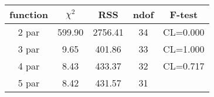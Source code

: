 \begin{tabular}{c|c|c|c|c}
function & $\chi^2$ & RSS & ndof & F-test \\
\hline
2 par & 599.90 & 2756.41 & 34 & CL=0.000 \\
3 par & 9.65 & 401.86 & 33 & CL=1.000 \\
4 par & 8.43 & 433.37 & 32 & CL=0.717 \\
5 par & 8.42 & 431.57 & 31 & \\
\hline
\end{tabular}